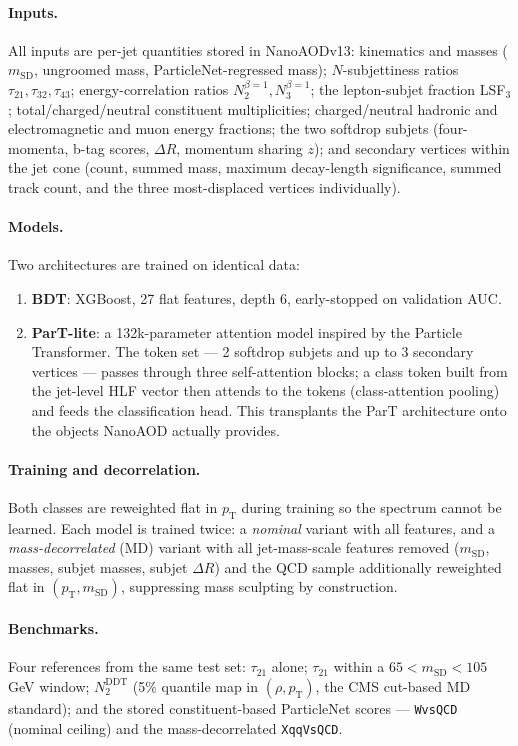 \documentclass[11pt,a4paper]{article}
\newcommand{\pt}{\ensuremath{p_{\mathrm{T}}}}
\newcommand{\msd}{\ensuremath{m_{\mathrm{SD}}}}
\begin{document}
\paragraph{Inputs.} All inputs are per-jet quantities stored in NanoAODv13:
kinematics and masses (\msd, ungroomed mass, ParticleNet-regressed mass);
$N$-subjettiness ratios $\tau_{21},\tau_{32},\tau_{43}$; energy-correlation
ratios $N_2^{\beta=1}, N_3^{\beta=1}$; the lepton-subjet fraction LSF$_3$;
total/charged/neutral constituent multiplicities; charged/neutral
hadronic and electromagnetic and muon energy fractions; the two softdrop
subjets (four-momenta, b-tag scores, $\Delta R$, momentum sharing $z$); and
secondary vertices within the jet cone (count, summed mass, maximum
decay-length significance, summed track count, and the three most-displaced
vertices individually).

\paragraph{Models.} Two architectures are trained on identical data:
\begin{enumerate}
  \item \textbf{BDT}: XGBoost, 27 flat features, depth 6,
    early-stopped on validation AUC.
  \item \textbf{ParT-lite}: a 132k-parameter attention model inspired by the
    Particle Transformer. The token set --- 2 softdrop subjets and up to 3
    secondary vertices --- passes through three self-attention blocks;
    a class token built from the jet-level HLF vector then attends to the
    tokens (class-attention pooling) and feeds the classification head.
    This transplants the ParT architecture onto the objects NanoAOD
    actually provides.
\end{enumerate}

\paragraph{Training and decorrelation.} Both classes are reweighted flat in
\pt{} during training so the spectrum cannot be learned. Each model is
trained twice: a \emph{nominal} variant with all features, and a
\emph{mass-decorrelated} (MD) variant with all jet-mass-scale features
removed (\msd, masses, subjet masses, subjet $\Delta R$) and the QCD sample
additionally reweighted flat in $(\pt,\msd)$, suppressing mass sculpting by
construction.

\paragraph{Benchmarks.} Four references from the same test set:
$\tau_{21}$ alone; $\tau_{21}$ within a $65<\msd<105\,$GeV window;
$N_2^{\mathrm{DDT}}$ (5\% quantile map in $(\rho,\pt)$, the CMS cut-based
MD standard); and the stored constituent-based ParticleNet scores ---
\texttt{WvsQCD} (nominal ceiling) and the mass-decorrelated
\texttt{XqqVsQCD}.
\end{document}
